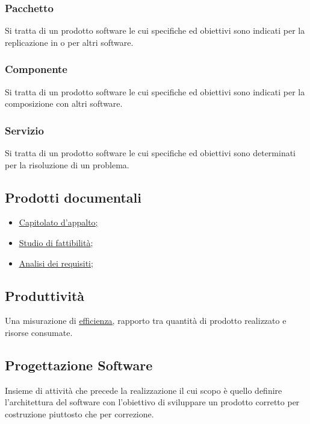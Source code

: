 		\subsubsection{Pacchetto}
		Si tratta di un prodotto software le cui specifiche ed obiettivi sono indicati per la replicazione in o per altri software.
		
		\subsubsection{Componente}
		Si tratta di un prodotto software le cui specifiche ed obiettivi sono indicati per la composizione con altri software.
		
		\subsubsection{Servizio}
		Si tratta di un prodotto software le cui specifiche ed obiettivi sono determinati per la risoluzione di un problema.
	
	\subsection{Prodotti documentali}	
	\label{sec:prodottidocumentali}
	\begin{itemize}  
	\item \underline{\hyperref[sec:capitolato]{Capitolato d'appalto};}
	\item \underline{\hyperref[sec:studiofattibilita]{Studio di fattibilità}};
	\item \underline{\hyperref[sec:analisirequisiti]{Analisi dei requisiti}};
	\end{itemize}	
		
	\subsection{Produttività}	
	\label{sec:produttivita}
	Una misurazione di \underline{\hyperref[sec:efficienza]{efficienza}}, rapporto tra quantità di prodotto realizzato e risorse consumate.

	\subsection{Progettazione Software}
	\label{sec:progettazionesoftware}
	Insieme di attività che precede la realizzazione il cui scopo è quello definire l'architettura del software con l'obiettivo di sviluppare un prodotto corretto per costruzione piuttosto che per correzione.
	
